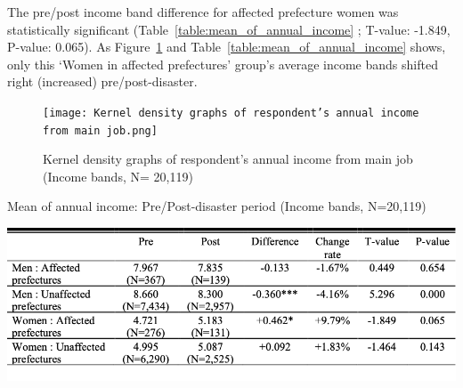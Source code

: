 \documentclass[a4paper,12pt]{article}
\begin{document}
\begin{table}[h]
\centering
\caption{JGSS Longitudinal Sample Size by Disaster Area Status and Survey Year, 2000-2018}
\label{tab:distribution}
\label{table:Longitudinal_sample}
\end{table}

The pre/post income band difference for affected prefecture women was statistically significant (Table~\ref{table:mean_of_annual_income} ; T-value: -1.849, P-value: 0.065). As Figure~\ref{fig:Kernel_density} and Table~\ref{table:mean_of_annual_income} shows, only this ‘Women in affected prefectures’ group's average income bands shifted right (increased) pre/post-disaster.

\begin{figure}[h!]
    \centering
    \texttt{[image: Kernel density graphs of respondent’s annual income from main job.png]}  %
    \caption{Kernel density graphs of respondent’s annual income from main job (Income bands, N= 20,119)}
    \label{fig:Kernel_density}
\end{figure}


\begin{table}[h!]
    \centering
    \caption{Mean of annual income: Pre/Post-disaster period (Income bands, N=20,119)}
    \label{tab:annual_income}
    \includegraphics[width=1.0\textwidth]{Annual income table.png} 
    \label{table:mean_of_annual_income}
\end{table}
\end{document}

